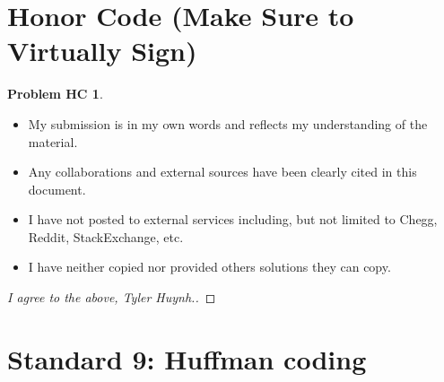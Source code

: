 \documentclass[11pt]{article}
\theoremstyle{definition}
\theoremstyle{definition}
\newtheorem*{requiredHC}{Problem HC}
\theoremstyle{definition}
\newcommand{\standard}{9}
\begin{document}
\newpage
\section*{Honor Code (Make Sure to Virtually Sign)} \label{HonorCode}
\hypertarget{HonorCode}{}

\begin{requiredHC}
\begin{itemize}
\item My submission is in my own words and reflects my understanding of the material.
\item Any collaborations and external sources have been clearly cited in this document.
\item I have not posted to external services including, but not limited to Chegg, Reddit, StackExchange, etc.
\item I have neither copied nor provided others solutions they can copy.
\end{itemize}

\end{requiredHC}

\begin{proof}[I agree to the above, Tyler Huynh.]
\end{proof}


\newpage
\setcounter{section}{\standard-1}
\section{Standard \standard: Huffman coding}
\end{document}
